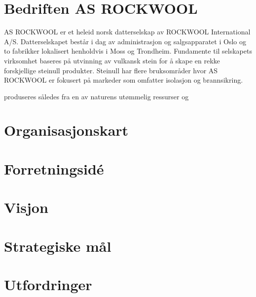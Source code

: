 \section{Bedriften AS ROCKWOOL}
AS ROCKWOOL er et heleid norsk datterselskap av ROCKWOOL International A/S.
Datterselskapet består i dag av administrasjon og salgsapparatet i Oslo og to fabrikker lokalisert henholdvis i Moss og Trondheim.
Fundamente til selskapets virksomhet baseres på utvinning av vulkansk stein for å skape en rekke forskjellige steinull produkter.
Steinull har flere bruksområder hvor AS ROCKWOOL er fokusert på markeder som omfatter isolasjon og brannsikring.

\indent \newline produseres således fra en av naturens utømmelig ressurser og

\section{Organisasjonskart}
\section{Forretningsidé}
\section{Visjon}
\section{Strategiske mål}
\section{Utfordringer}
